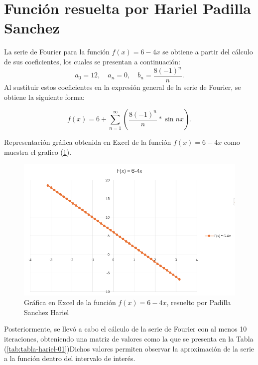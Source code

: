{%
\section{Función resuelta por Hariel Padilla Sanchez}
\label{sec:class-options}


La serie de Fourier para la función \( f(x) = 6-4x \) se obtiene a partir del cálculo de sus coeficientes, los cuales se presentan a continuación:
\[
a_0 = 12, \quad a_n = 0, \quad b_n = \frac{8(-1)^n}{n}.
\]
Al sustituir estos coeficientes en la expresión general de la serie de Fourier, se obtiene la siguiente forma:

\begin{equation}
\label{eq:serieFourier-6-4x}
f(x) = 6 + \sum_{n=1}^{\infty} \left( \frac{8(-1)^n }{n} * \sin{nx} \right).
\end{equation}

Representación gráfica obtenida en Excel de la función \(f(x) =6-4x\) como muestra el grafico (\ref{fig:figure-hariel-03}). 

\begin{figure}[H]
    \centering
    \includegraphics[width=\linewidth]{Figures/fourierHariel/fase2/funcion_sola.png}
    \caption[Gráfica en Excel de la función \(f(x)=6-4x\)]{Gráfica en Excel de la función  \(f(x)=6-4x\), resuelto por Padilla Sanchez Hariel}
    \label{fig:figure-hariel-03}
\end{figure}

Posteriormente, se llevó a cabo el cálculo de la serie de Fourier con al menos 10 iteraciones, obteniendo una matriz de valores como la que se presenta en la Tabla (\ref{tab:tabla-hariel-01})Dichos valores permiten observar la aproximación de la serie a la función dentro del intervalo de interés.

}
